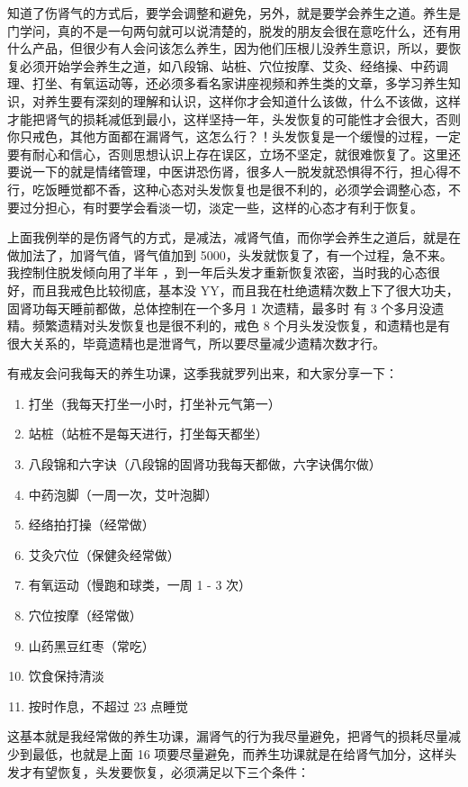 \documentclass[fontset=founder]{ctexart}
\begin{document}
知道了伤肾气的方式后，要学会调整和避免，另外，就是要学会养生之道。养生是门学问，真的不是一句两句就可以说清楚的，脱发的朋友会很在意吃什么，还有用什么产品，但很少有人会问该怎么养生，因为他们压根儿没养生意识，所以，要恢复必须开始学会养生之道，如八段锦、站桩、穴位按摩、艾灸、经络操、中药调理、打坐、有氧运动等，还必须多看名家讲座视频和养生类的文章，多学习养生知识，对养生要有深刻的理解和认识，这样你才会知道什么该做，什么不该做，这样才能把肾气的损耗减低到最小，这样坚持一年，头发恢复的可能性才会很大，否则你只戒色，其他方面都在漏肾气，这怎么行？！头发恢复是一个缓慢的过程，一定要有耐心和信心，否则思想认识上存在误区，立场不坚定，就很难恢复了。这里还要说一下的就是情绪管理，中医讲恐伤肾，很多人一脱发就恐惧得不行，担心得不行，吃饭睡觉都不香，这种心态对头发恢复也是很不利的，必须学会调整心态，不要过分担心，有时要学会看淡一切，淡定一些，这样的心态才有利于恢复。

上面我例举的是伤肾气的方式，是减法，减肾气值，而你学会养生之道后，就是在做加法了，加肾气值，肾气值加到 5000，头发就恢复了，有一个过程，急不来。我控制住脱发倾向用了半年 ，到一年后头发才重新恢复浓密，当时我的心态很好，而且我戒色比较彻底，基本没 YY，而且我在杜绝遗精次数上下了很大功夫，固肾功每天睡前都做，总体控制在一个多月 1 次遗精，最多时 有 3 个多月没遗精。频繁遗精对头发恢复也是很不利的，戒色 8 个月头发没恢复，和遗精也是有很大关系的，毕竟遗精也是泄肾气，所以要尽量减少遗精次数才行。

有戒友会问我每天的养生功课，这季我就罗列出来，和大家分享一下：

\begin{enumerate}
    \item 打坐（我每天打坐一小时，打坐补元气第一）
    \item 站桩（站桩不是每天进行，打坐每天都坐）
    \item 八段锦和六字诀（八段锦的固肾功我每天都做，六字诀偶尔做）
    \item 中药泡脚（一周一次，艾叶泡脚）
    \item 经络拍打操（经常做）
    \item 艾灸穴位（保健灸经常做）
    \item 有氧运动（慢跑和球类，一周 1 - 3 次）
    \item 穴位按摩（经常做）
    \item 山药黑豆红枣（常吃）
    \item 饮食保持清淡
    \item 按时作息，不超过 23 点睡觉
\end{enumerate}

这基本就是我经常做的养生功课，漏肾气的行为我尽量避免，把肾气的损耗尽量减少到最低，也就是上面 16 项要尽量避免，而养生功课就是在给肾气加分，这样头发才有望恢复，头发要恢复，必须满足以下三个条件：
\end{document}

